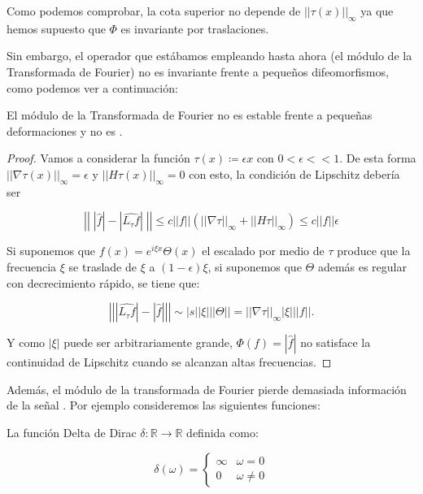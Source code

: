 \noindent Como podemos comprobar, la cota superior no depende de $||\tau(x)||_\infty$ ya que hemos supuesto que $\Phi$ es invariante por traslaciones. 

\noindent Sin embargo, el operador que estábamos empleando hasta ahora (el módulo de la Transformada de Fourier) no es invariante frente a pequeños difeomorfismos, como podemos ver a continuación:

\begin{lema} \label{lemma:TF_inestable_difeomorfismos}
El módulo de la Transformada de Fourier no es estable frente a pequeñas deformaciones y no es .
\end{lema}

\begin{proof}
\noindent Vamos a considerar la función $\tau(x)\coloneqq \epsilon x$ con $0 < \epsilon << 1$. De esta forma $||\nabla \tau (x) ||_\infty = \epsilon$ y $||H\tau(x)||_\infty=0$ con esto, la condición de Lipschitz debería ser

$$\left|\left| \; |\widehat{f}| -|\widehat{L_\tau f}| \; \right|\right| \leq c ||f|| (||\nabla \tau ||_{\infty} + ||H\tau||_\infty) \leq c ||f|| \epsilon$$

\noindent Si suponemos que $f(x)=e^{i\xi x} \Theta(x)$ el escalado por medio de $\tau$ produce que la frecuencia $\xi$ se traslade de $\xi$ a $(1-\epsilon)\xi$, si suponemos que $\Theta$ además es regular con decrecimiento rápido, se tiene que:

$$\left|\left| |\widehat{L_\tau f}|-|\widehat{f}| \right|\right| \sim |s| |\xi| ||\Theta|| = ||\nabla \tau||_\infty |\xi| ||f||.$$

\noindent Y como $|\xi|$ puede ser arbitrariamente grande, $\Phi(f)=|\widehat{f}|$ no satisface la continuidad de Lipschitz cuando se alcanzan altas frecuencias.
\end{proof}
    
\medskip

\noindent Además, el módulo de la transformada de Fourier pierde demasiada información de la señal \cite{bruna2013invariant}. Por ejemplo consideremos las siguientes funciones: 

\begin{definicion}
  La función Delta de Dirac $\delta: \mathbb{R} \rightarrow \mathbb{R}$ definida como:

  $$ \delta(\omega)= \begin{cases} 
    \infty & \omega=0 \\
    0 &  \omega \neq 0
 \end{cases}$$
  
\end{definicion}

